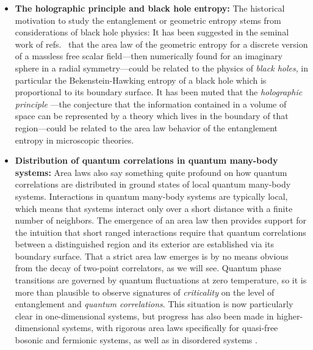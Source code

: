 \documentclass[12pt, rmp,floatfix,epsfig,graphics]{revtex4} %
\begin{document}
\begin{itemize}

\item {\bf The holographic principle and black hole entropy:} 
The historical motivation to study the entanglement or geometric 
entropy stems from considerations of black hole physics: It 
has been suggested in the seminal work of refs.\ 
\cite{Bombelli,Srednicki} that the area law of the geometric 
entropy for a discrete version of a massless free scalar 
field---then numerically found for an imaginary sphere in 
a radial symmetry---could be related to the physics of 
{\it black holes},\cite{HardStuff} in particular the 
Bekenstein-Hawking entropy of a black hole which is proportional
to its boundary surface. It has been muted that 
the {\it holographic principle} \cite{Holographic}---the 
conjecture that the information contained in a volume of 
space can be represented by a theory which lives in the 
boundary of that region---could be related to the area 
law behavior of the entanglement entropy in microscopic
theories.

\item {\bf Distribution of quantum correlations in quantum 
many-body systems:} Area laws also say something quite profound 
on how quantum correlations are distributed in ground states of 
local quantum many-body systems. Interactions in quantum many-body 
systems are typically local, which means that systems interact 
only over a short distance with a finite number of neighbors. 
The emergence of an area law then provides support for the
intuition that short ranged interactions require that quantum 
correlations between a distinguished region and its exterior 
are established via its boundary surface. That a strict area 
law emerges is by no means obvious from the decay of two-point 
correlators, as we will see. Quantum phase transitions are 
governed by quantum fluctuations at zero temperature, so it 
is more than plausible to observe signatures of {\it criticality} 
on the level of entanglement and {\it quantum correlations}. This 
situation is now particularly clear in one-dimensional systems, 
\cite{Harmonic,Latorre1,Fannes,Korepin,FranciniLong,Calabrese,Latorre2,Single,Its,Keating,Farkas,OldBriegel,Quench,Vidal,JVidalLong,Vidal2,Casini,Cardy2,OneD,Cardy3,Review}
but progress has also been made in higher-dimensional systems,\cite{Area,Area2,Area3,Graphs,Quench2,LatorreReview,PEPS,Wolf,FarkasLong,Preskill,Fradkin}
with rigorous area laws specifically for quasi-free bosonic \cite{Area,Area2,Area3} and 
fermionic \cite{Wolf,Klich,Halfspace,FarkasLong} systems,
as well as in
disordered systems \cite{Refael2}.


\end{itemize}
\end{document}
